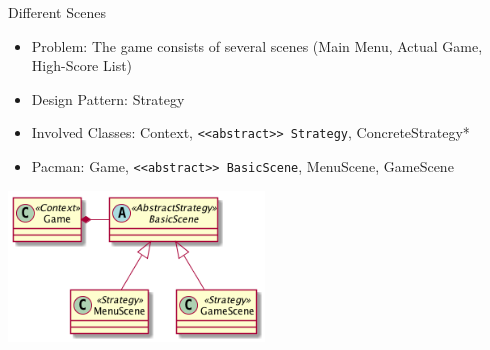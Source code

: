 \documentclass[10pt,t,a4paper]{beamer}
\begin{document}
\begin{frame}[fragile,label=sec-1-6]{Different Scenes}
 \begin{itemize}
\item Problem: The game consists of several scenes (Main Menu, Actual Game, High-Score List)
\item Design Pattern: Strategy
\item Involved Classes: Context, \texttt{<<abstract>> Strategy}, ConcreteStrategy*
\item Pacman: Game, \texttt{<<abstract>> BasicScene}, MenuScene, GameScene
\end{itemize}

\includegraphics[height=4cm]{FPM_Scenes.png}
\end{frame}
\end{document}
